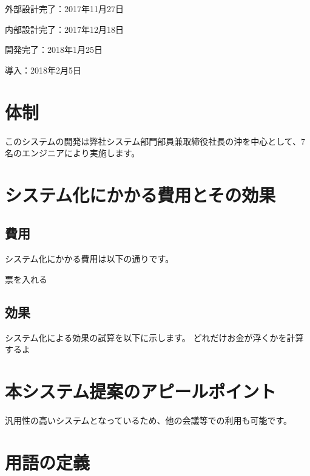 \documentclass[a4j,titlepage]{ujarticle}
\begin{document}
外部設計完了：2017年11月27日

内部設計完了：2017年12月18日

開発完了：2018年1月25日

導入：2018年2月5日
\section{体制}
このシステムの開発は弊社システム部門部員兼取締役社長の沖を中心として、7名のエンジニアにより実施します。
\section{システム化にかかる費用とその効果}
\subsection{費用}
システム化にかかる費用は以下の通りです。

票を入れる


\subsection{効果}
システム化による効果の試算を以下に示します。
どれだけお金が浮くかを計算するよ

\section{本システム提案のアピールポイント}
汎用性の高いシステムとなっているため、他の会議等での利用も可能です。

\section{用語の定義}
\newpage
\end{document}
